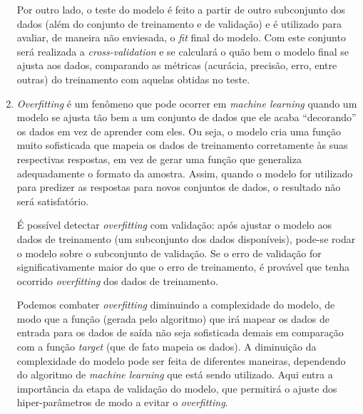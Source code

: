 \documentclass[a4paper,11pt]{article}
\begin{document}
\begin{enumerate}
        Por outro lado, o teste do modelo é feito a partir de outro subconjunto dos dados (além do conjunto de treinamento e de validação) e é utilizado para avaliar, de maneira não enviesada, o \textit{fit} final do modelo. Com este conjunto será realizada a \textit{cross-validation} e se calculará o quão bem o modelo final se ajusta aos dados, comparando as métricas (acurácia, precisão, erro, entre outras) do treinamento com aquelas obtidas no teste.

        \item \textit{Overfitting} é um fenômeno que pode ocorrer em \textit{machine learning} quando um modelo se ajusta tão bem a um conjunto de dados que ele acaba ``decorando'' os dados em vez de aprender com eles. Ou seja, o modelo cria uma função muito sofisticada que mapeia os dados de treinamento corretamente às suas respectivas respostas, em vez de gerar uma função que generaliza adequadamente o formato da amostra. Assim, quando o modelo for utilizado para predizer as respostas para novos conjuntos de dados, o resultado não será satisfatório.
        
        É possível detectar \textit{overfitting} com validação: após ajustar o modelo aos dados de treinamento (um subconjunto dos dados disponíveis), pode-se rodar o modelo sobre o subconjunto de validação. Se o erro de validação for significativamente maior do que o erro de treinamento, é provável que tenha ocorrido \textit{overfitting} dos dados de treinamento.
        
        Podemos combater \textit{overfitting} diminuindo a complexidade do modelo, de modo que a função (gerada pelo algoritmo) que irá mapear os dados de entrada para os dados de saída não seja sofisticada demais em comparação com a função \textit{target} (que de fato mapeia os dados). A diminuição da complexidade do modelo pode ser feita de diferentes maneiras, dependendo do algoritmo de \textit{machine learning} que está sendo utilizado. Aqui entra a importância da etapa de validação do modelo, que permitirá o ajuste dos hiper-parâmetros de modo a evitar o \textit{overfitting}.

    \end{enumerate}
    
\end{document}
